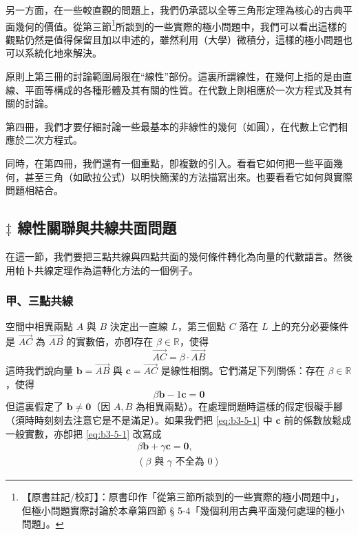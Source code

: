另一方面，在一些較直觀的問題上，我們仍承認以全等三角形定理為核心的古典平面幾何的價值。從第三節\label{note:b3-ch5-p224-sec-ref}\footnote{【原書註記/校訂】：原書印作「從第三節所談到的一些實際的極小問題中」，但極小問題實際討論於本章第四節 § 5-4「幾個利用古典平面幾何處理的極小問題」。}所談到的一些實際的極小問題中，我們可以看出這樣的觀點仍然是值得保留且加以申述的，雖然利用（大學）微積分，這樣的極小問題也可以系統化地來解決。

原則上第三冊的討論範圍局限在“線性”部份。這裏所謂線性，在幾何上指的是由直線、平面等構成的各種形體及其有關的性質。在代數上則相應於一次方程式及其有關的討論。

第四冊，我們才要仔細討論一些最基本的非線性的幾何（如圓），在代數上它們相應於二次方程式。

同時，在第四冊，我們還有一個重點，卽複數的引入。看看它如何把一些平面幾何，甚至三角（如歐拉公式）以明快簡潔的方法描寫出來。也要看看它如何與實際問題相結合。

\subsection{\texorpdfstring{$\ddagger$ }{‡ }線性關聯與共線共面問題}\label{sec:b3-5-1}

在這一節，我們要把三點共線與四點共面的幾何條件轉化為向量的代數語言。然後用帕卜共線定理作為這轉化方法的一個例子。

\subsubsection*{甲、三點共線}

空間中相異兩點 $A$ 與 $B$ 決定出一直線 $L$，第三個點 $C$ 落在 $L$ 上的充分必要條件是 $\vec{AC}$ 為 $\vec{AB}$ 的實數倍，亦卽存在 $\beta \in \mathbb{R}$，使得
\[ \vec{AC} = \beta \cdot \vec{AB} \]
這時我們說向量 $\mathbf{b} = \vec{AB}$ 與 $\mathbf{c} = \vec{AC}$ 是線性相關。它們滿足下列關係：存在 $\beta \in \mathbb{R}$，使得
\begin{equation}
\beta \mathbf{b} - 1\mathbf{c} = \mathbf{0} \label{eq:b3-5-1}
\end{equation}
但這裏假定了 $\mathbf{b} \neq \mathbf{0}$（因 $A, B$ 為相異兩點）。在處理問題時這樣的假定很礙手腳（須時時刻刻去注意它是不是滿足）。如果我們把 \eqref{eq:b3-5-1} 中 $\mathbf{c}$ 前的係數放鬆成一般實數，亦卽把 \eqref{eq:b3-5-1} 改寫成
\begin{equation}
\begin{split}
\beta \mathbf{b} + \gamma \mathbf{c} = \mathbf{0}, \\
(\beta \text{ 與 } \gamma \text{ 不全為 } 0)
\end{split} \label{eq:b3-5-2}
\end{equation}

